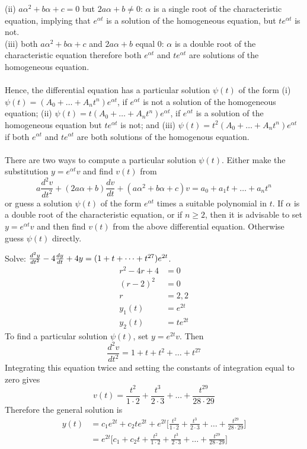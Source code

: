 \documentclass[12pt]{article}
\begin{document}
(ii) $a\alpha^2 + b\alpha + c = 0$ but $2a\alpha + b \neq 0$: $\alpha$ is a single root of the characteristic equation, implying that $e^{\alpha t}$ is a solution of the homogeneous equation, but $te^{\alpha t}$ is not. \\
(iii) both $a\alpha^2 + b\alpha + c$ and $2a\alpha + b$ equal 0: $\alpha$ is a double root of the characteristic equation therefore both $e^{\alpha t}$ and $te^{\alpha t}$ are solutions of the homogeneous equation. \\~\\
Hence, the differential equation has a particular solution $\psi(t)$ of the form (i) $\psi(t) = (A_0 + \dots + A_nt^n)e^{\alpha t}$, if $e^{\alpha t}$ is not a solution of the homogeneous equation; (ii) $\psi(t) = t(A_0 + \dots + A_nt^n)e^{\alpha t}$, if $e^{\alpha t}$ is a solution of the homogeneous equation but $te^{\alpha t}$ is not; and (iii) $\psi(t) = t^2(A_0 + \dots + A_nt^n)e^{\alpha t}$ if both $e^{\alpha t}$ and $te^{\alpha t}$ are both solutions of the homogenous equation. \\~\\
There are two ways to compute a particular solution $\psi(t)$. Either make the substitution $y = e^{\alpha t}v$ and find $v(t)$ from $$a\frac{d^2v}{dt^2} + (2a\alpha + b)\frac{dv}{dt} + (a\alpha^2 + b\alpha + c)v = a_0 + a_1t + \dots + a_nt^n$$ or guess a solution $\psi(t)$ of the form $e^{\alpha t}$ times a suitable polynomial in $t$. If $\alpha$ is a double root of the characteristic equation, or if $n \geq 2$, then it is advisable to set $y = e^{\alpha t}v$ and then find $v(t)$ from the above differential equation. Otherwise guess $\psi(t)$ directly. 

\begin{example} Solve: $\frac{d^2y}{dt^2} - 4\frac{dy}{dt} + 4y = (1 + t + \dots + t^{27})e^{2t}$. \\
$$\begin{aligned} r^2 - 4r + 4 &= 0 \\ (r - 2)^2 &= 0 \\ r &= 2, 2 \\ y_1(t) &= e^{2t} \\ y_2(t) &= te^{2t} \end{aligned} $$ To find a particular solution $\psi(t)$, set $y = e^{2t}v$. Then $$\frac{d^2v}{dt^2} = 1 + t + t^2 + \dots + t^{27}$$ Integrating this equation twice and setting the constants of integration equal to zero gives $$v(t) = \frac{t^2}{1 \cdot 2} + \frac{t^3}{2 \cdot 3} + \dots + \frac{t^{29}}{28 \cdot 29} $$ Therefore the general solution is $$\begin{aligned} y(t) &= c_1e^{2t} + c_2te^{2t} + e^{2t} \Big[ \frac{t^2}{1 \cdot 2} + \frac{t^3}{2 \cdot 3} + \dots + \frac{t^{29}}{28 \cdot 29}\Big] \\ &= e^{2t}\Big[c_1 + c_2t + \frac{t^2}{1 \cdot 2} + \frac{t^3}{2 \cdot 3} + \dots + \frac{t^{29}}{28 \cdot 29}\Big] \end{aligned} $$ \end{example} 
\end{document}
